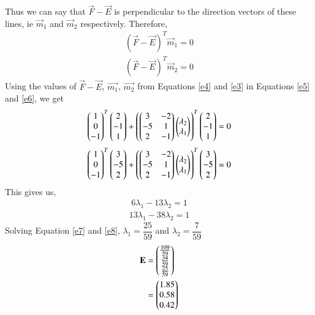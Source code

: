 \documentclass[journal,12pt,twocolumn]{IEEEtran}
\begin{document}
Thus we can say that $\vec{F}-\vec{E}$ is perpendicular to the direction vectors of these lines, ie $\vec{m}_1$ and $\vec{m}_2$ respectively. Therefore,
\begin{align}\label{e5}
    (\vec{F}-\vec{E})^T \vec{m}_1 = 0
\end{align}
\begin{align}\label{e6}
    (\vec{F}-\vec{E})^T \vec{m}_2 = 0
\end{align}
Using the values of $\vec{F}-\vec{E}$, $\vec{m_1}$, $\vec{m_2}$ from Equations \ref{e4} and \ref{e3} in Equations \ref{e5} and \ref{e6}, we get
\begin{align}
    \begin{pmatrix}1\\ 0 \\ -1\end{pmatrix}^T\begin{pmatrix}2 \\ -1 \\ 1\end{pmatrix}+\left(\begin{pmatrix}3&-2\\-5&1\\2&-1\end{pmatrix}\begin{pmatrix}\lambda_2 \\ \lambda_1\end{pmatrix}\right)^T\begin{pmatrix}2 \\ -1 \\ 1\end{pmatrix} = 0
\end{align}
\begin{align}
    \begin{pmatrix}1\\ 0 \\ -1\end{pmatrix}^T\begin{pmatrix}3 \\ -5 \\ 2\end{pmatrix}+\left(\begin{pmatrix}3&-2\\-5&1\\2&-1\end{pmatrix}\begin{pmatrix}\lambda_2 \\ \lambda_1\end{pmatrix}\right)^T\begin{pmatrix}3 \\ -5 \\ 2\end{pmatrix} = 0
\end{align}
This gives us,
\begin{align}\label{e7}
    6\lambda_1 -13\lambda_2 = 1
\end{align}
\begin{align}\label{e8}
   13\lambda_1 -38\lambda_2 = 1
\end{align}
Solving Equation \ref{e7} and \ref{e8}, $\lambda_1 = \dfrac{25}{59}$ and $\lambda_2 = \dfrac{7}{59}$\\
\begin{align}
    \mathbf{E} & = \begin{pmatrix}\frac{109}{59} \\ \frac{34}{59}
    \\ \frac{25}{59}\end{pmatrix}
    \\&=\begin{pmatrix}1.85 \\ 0.58 \\ 0.42\end{pmatrix}
\end{align}
\end{document}
